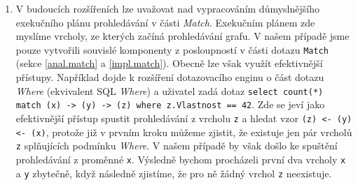 \begin{enumerate}
\item
V budoucích rozšířeních lze uvažovat nad vypracováním důmyslnějšího exekučního plánu prohledávání v části \textit{Match}.
Exekučním plánem zde myslíme vrcholy, ze kterých začíná prohledávání grafu.
V našem případě jsme pouze vytvořili souvislé komponenty z posloupností v části dotazu \texttt{Match} (sekce \ref{anal.match} a \ref{impl.match}).
Obecně lze však využít efektivnější přístupy.
Například dojde k rozšíření dotazovacího enginu o část dotazu \textit{Where} (ekvivalent SQL \textit{Where}) a uživatel zadá dotaz \texttt{select count(*) match (x) -> (y) -> (z) where z.Vlastnost == 42}.
Zde se jeví jako efektivnější přístup spustit prohledávání z vrcholu \texttt{z} a hledat vzor \texttt{(z) <- (y) <- (x)}, protože již v prvním kroku můžeme zjistit, že existuje jen pár vrcholů \texttt{z} splňujících podmínku \textit{Where}.
V našem případě by však došlo ke spuštění prohledávání z proměnné \texttt{x}.
Výsledně bychom procházeli první dva vrcholy \texttt{x} a \texttt{y} zbytečně, když následně zjistíme, že pro ně žádný vrchol \texttt{z} neexistuje.

\end{enumerate}



